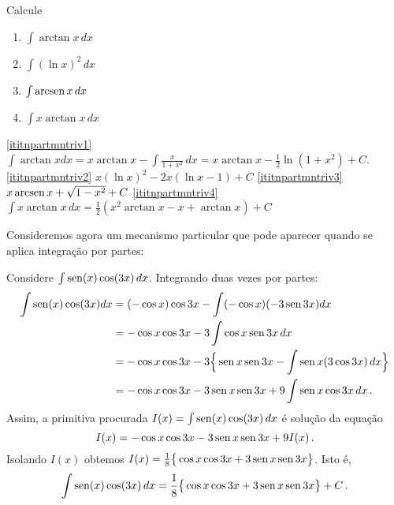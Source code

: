 \begin{exo} Calcule 
\begin{multicols}{2}
\begin{enumerate}
\item\label{ititnpartmntriv1} $\int \arctan x \,dx$
\item\label{ititnpartmntriv2} $\int (\ln x)^2\,dx$
\item\label{ititnpartmntriv3} $\int \operatorname{arcsen} x\,dx$
\item\label{ititnpartmntriv4} $\int x\arctan x\,dx$
\end{enumerate}
\end{multicols}
\vspace{0.01cm}
\begin{sol} \eqref{ititnpartmntriv1}
$\int \arctan x dx=x\arctan
x-\int\frac{x}{1+x^2}\,dx=x\arctan x-\tfrac12 \ln (1+x^2)+C$.
\eqref{ititnpartmntriv2} $x(\ln x)^2-2x(\ln x-1)+C$
\eqref{ititnpartmntriv3} $x\operatorname{arcsen} x+\sqrt{1-x^2}+C$
\eqref{ititnpartmntriv4} $\int x\arctan x\,dx=\frac12(x^2\arctan x-x+\arctan x)+C$
\end{sol}
\end{exo}



Consideremos agora um mecanismo particular que pode aparecer quando se aplica
integração por partes:
\begin{ex}
Considere $\int\operatorname{sen}(x)\cos (3x)\,dx$. Integrando duas vezes por partes:
\begin{align*}
\int \operatorname{sen}(x)\cos (3x)dx&=(-\cos x) \cos 3x-\int (-\cos x)(-3\operatorname{sen} 3x)dx\\
&=-\cos x\cos 3x-3\int \cos x\operatorname{sen} 3x\,dx\\
&=-\cos x\cos 3x-3\Big\{
\operatorname{sen} x\operatorname{sen} 3x-\int \operatorname{sen} x(3\cos 3x)\,dx
\Big\}\\
&=-\cos x\cos 3x-3
\operatorname{sen} x\operatorname{sen} 3x+9\int \operatorname{sen} x\cos 3x\,dx\,.
\end{align*}
Assim, a primitiva procurada $I(x)=\int\operatorname{sen}(x)\cos (3x)\,dx$
é solução da equação
$$
I(x)=-\cos x\cos 3x-3\operatorname{sen} x\operatorname{sen} 3x+9 I(x)\,.
$$
Isolando $I(x)$ obtemos
$I(x)=\frac{1}{8}\big\{\cos x\cos 3x+3\operatorname{sen} x\operatorname{sen} 3x \big\}$. Isto é,
$$\int \operatorname{sen}(x)\cos (3x)\,dx=\frac{1}{8}\big\{
\cos x\cos 3x+3\operatorname{sen} x\operatorname{sen} 3x \big\}+C\,.$$
\end{ex}


